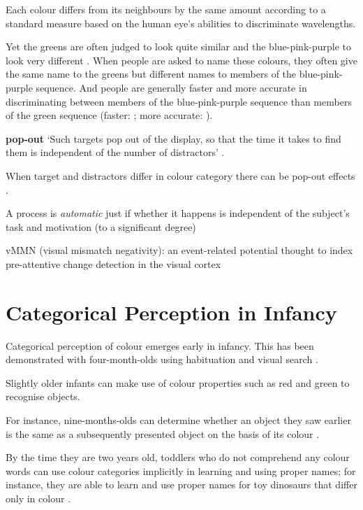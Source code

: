 \documentclass[12pt]{extarticle}
\begin{document}
\begin{multicols}{3}
Each colour differs from its neighbours by the same amount according to a standard measure based on the human eye's abilities to discriminate wavelengths.
 
Yet the greens are often judged to look quite similar and the blue-pink-purple to look very different \citep[p.\ 12--7]{Roberson:1999rk}.
When people are asked to name these colours, they often give the same name to the greens but different names to members of the blue-pink-purple sequence.
And people are generally faster and more accurate in discriminating between members of the blue-pink-purple sequence than members of the green sequence (faster: \citealp{Bornstein:1984cb}; more accurate: \citealp[p.\ 22--7]{Roberson:1999rk}).
 
\textbf{pop-out} ‘Such targets pop out of the display, so that the time it takes to find them is independent of the number of distractors’ \citep[p.\ 117]{Treisman:1986pm}.
 
When target and distractors differ in colour category there can be pop-out effects \citep{Daoutis:2006qk}.
 
A process is \emph{automatic} just if
whether it happens is independent of the subject’s task and motivation (to a significant degree)
 
vMMN (visual mismatch negativity): an event-related potential thought to index pre-attentive change detection in the visual cortex

 
 
 
\section{Categorical Perception in Infancy}
 
Categorical perception of colour emerges early in infancy. This has been demonstrated with four-month-olds using habituation \citep{Bornstein:1976of} and visual search \citep{Franklin:2005xk}.
 
Slightly older infants can make use of colour properties such as red and green to recognise objects.
 
For instance, nine-months-olds can determine whether an object they saw earlier is the same as a subsequently presented object on the basis of its colour \citep{Wilcox:2008jk}.
 
By the time they are two years old, toddlers who do not comprehend any colour words can use colour categories implicitly in learning and using proper names; for instance, they are able to learn and use proper names for toy dinosaurs that differ only in colour \citep[][Experiment 3]{Soja:1994np}.
 

\end{multicols}
\end{document}
